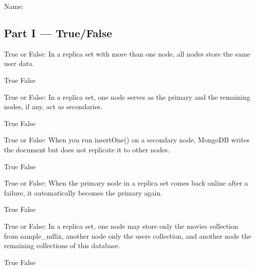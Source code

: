 \documentclass[12pt,answers]{exam}
\begin{document}
\noindent Name:\ \makebox[3in]{\hrulefill}
\begin{questions}

\section*{Part I — True/False}

\begin{minipage}{\linewidth}
\question[2]
True or False: In a replica set with more than one node, all nodes store the same user data.
\begin{checkboxes}
    \CorrectChoice True
    \choice False
\end{checkboxes}
\end{minipage}

\begin{minipage}{\linewidth}
\question[2]
True or False: In a replica set, one node serves as the primary and the remaining nodes, if any, act as secondaries.
\begin{checkboxes}
    \CorrectChoice True
    \choice False
\end{checkboxes}
\end{minipage}

\begin{minipage}{\linewidth}
\question[2]
True or False: When you run insertOne() on a secondary node, MongoDB writes the document but does not replicate it to other nodes.
\begin{checkboxes}
    \choice True
    \CorrectChoice False
\end{checkboxes}
\end{minipage}

\begin{minipage}{\linewidth}
\question[2]
True or False: When the primary node in a replica set comes back online after a failure, it automatically becomes the primary again.
\begin{checkboxes}
    \choice True
    \CorrectChoice False
\end{checkboxes}
\end{minipage}

\begin{minipage}{\linewidth}
\question[2]
True or False: In a replica set, one node may store only the movies collection from sample\_mflix, another node only the users collection, and another node the remaining collections of this database.
\begin{checkboxes}
    \choice True
    \CorrectChoice False
\end{checkboxes}
\end{minipage}


\end{questions}
\end{document}
